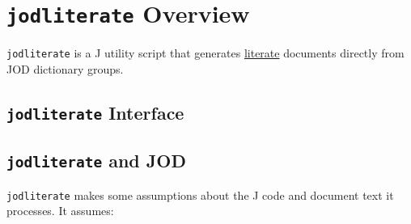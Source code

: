 \section{\texttt{jodliterate} Overview}

\texttt{jodliterate} is a J utility script that generates
\href{https://en.wikipedia.org/wiki/Literate_programming}{literate} documents directly from JOD dictionary groups.

\subsection{\texttt{jodliterate} Interface}

\begin{Shaded}
\begin{Highlighting}[]
\hyperlink{grplit}{}
\hyperlink{setjodliterate}{}
\hyperlink{ifacesection}{}
\end{Highlighting}
\end{Shaded}


\subsection{\texttt{jodliterate} and JOD}

\texttt{jodliterate} makes some assumptions about the J code and
document text it processes. It assumes:

